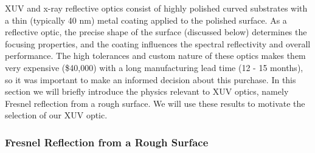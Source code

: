 
XUV and x-ray reflective optics consist of highly polished curved substrates with a thin (typically 40 nm) metal coating applied to the polished surface. As a reflective optic, the precise shape of the surface (discussed below) determines the focusing properties, and the coating influences the spectral reflectivity and overall performance. The high tolerances and custom nature of these optics makes them very expensive (\$40,000) with a long manufacturing lead time (12 - 15 months), so it was important to make an informed decision about this purchase. In this section we will briefly introduce the physics relevant to XUV optics, namely Fresnel reflection from a rough surface. We will use these results to motivate the selection of our XUV optic.

\subsubsection{Fresnel Reflection from a Rough Surface}

